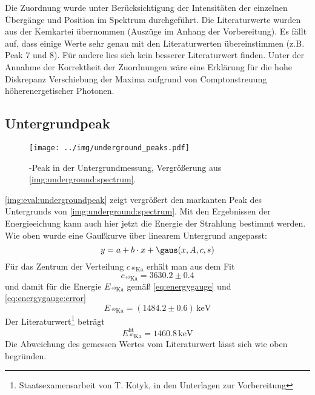 Die Zuordnung wurde unter Berücksichtigung der Intensitäten der einzelnen Übergänge und Position im Spektrum durchgeführt. Die Literaturwerte 
wurden aus der Kemkartei übernommen (Auszüge im Anhang der Vorbereitung). Es fällt auf, dass einige Werte sehr genau mit den Literaturwerten 
übereinstimmen (z.B. Peak 7 und 8). Für andere lies sich kein besserer Literaturwert finden. Unter der Annahme der Korrektheit der Zuordnungen wäre 
eine Erklärung für die hohe Diskrepanz Verschiebung der Maxima aufgrund von Comptonstreuung höherenergetischer Photonen.

\subsection{Untergrundpeak}
\label{sub:eval:undergroundpeak}

\begin{figure}[H]
\begin{center}
  \texttt{[image: ../img/underground\_peaks.pdf]}
  \caption{-Peak in der Untergrundmessung, Vergrößerung aus \autoref{img:underground:spectrum}.}
  \label{img:eval:undergroundpeak}
\end{center}
\end{figure}

\autoref{img:eval:undergroundpeak} zeigt vergrößert
den markanten Peak des Untergrunds von \autoref{img:underground:spectrum}.
Mit den Ergebnissen der Energieeichung kann auch hier jetzt die Energie der Strahlung bestimmt werden.
Wie oben wurde eine Gaußkurve über linearem Untergrund angepasst:
\begin{equation}
  y = a + b \cdot x + \gaus(x, A, c, s)
\end{equation}
Für das Zentrum der Verteilung $c_{\,{}^{40}\text{Ka}}$ erhält man aus dem Fit
\begin{equation}
  c_{\,{}^{40}\text{Ka}} = 3630.2 \pm 0.4	
\end{equation}
und damit für die Energie $E_{\,{}^{40}\text{Ka}}$ gemäß \autoref{eq:energygauge} und \autoref{eq:energygauge:error}
\begin{equation}
  E_{\,{}^{40}\text{Ka}} = (1484.2 \pm 0.6)\,\text{keV}
\end{equation}
Der Literaturwert\footnote{Staatsexamensarbeit von T. Kotyk, in den Unterlagen zur Vorbereitung} beträgt
\begin{equation}
  E_{\,{}^{40}\text{Ka}}^{\text{lit}} = 1460.8\,\text{keV}
\end{equation}
Die Abweichung des gemessen Wertes vom Literaturwert lässt sich wie oben begründen.


